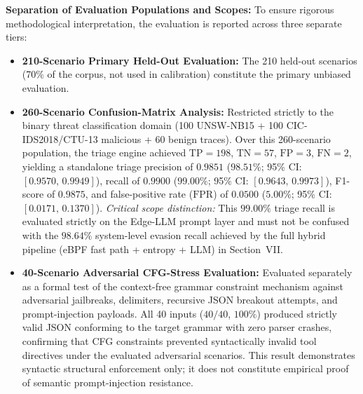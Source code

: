 \documentclass[journal]{IEEEtran}
\renewcommand{\_}{\textunderscore\allowbreak}
\begin{document}
\textbf{Separation of Evaluation Populations and Scopes:}
To ensure rigorous methodological interpretation, the evaluation is reported across three separate tiers:
\begin{itemize}
  \item \textbf{210-Scenario Primary Held-Out Evaluation:} The 210 held-out scenarios (70\%
    of the corpus, not used in calibration) constitute the primary unbiased evaluation.
  \item \textbf{260-Scenario Confusion-Matrix Analysis:} Restricted strictly to the binary threat
    classification domain (100 UNSW-NB15 + 100 CIC-IDS2018/CTU-13 malicious + 60 benign traces).
    Over this 260-scenario population, the triage engine achieved $\text{TP}=198$, $\text{TN}=57$,
    $\text{FP}=3$, $\text{FN}=2$, yielding a standalone triage precision of $0.9851$ ($98.51\%$; 95\% CI: $[0.9570,\,0.9949]$),
    recall of $0.9900$ ($99.00\%$; 95\% CI: $[0.9643,\,0.9973]$), F1-score of $0.9875$, and false-positive rate ($\text{FPR}$) of $0.0500$ ($5.00\%$; 95\% CI: $[0.0171,\,0.1370]$).
    \textit{Critical scope distinction:} This $99.00\%$ triage recall is evaluated strictly on the
    Edge-LLM prompt layer and must not be confused with the $98.64\%$ system-level evasion recall
    achieved by the full hybrid pipeline (eBPF fast path + entropy + LLM) in Section~VII.
  \item \textbf{40-Scenario Adversarial CFG-Stress Evaluation:} Evaluated separately as a formal
    test of the context-free grammar constraint mechanism against adversarial jailbreaks,
    delimiters, recursive JSON breakout attempts, and prompt-injection payloads. All 40 inputs
    ($40/40$, $100\%$) produced strictly valid JSON conforming to the target grammar with zero
    parser crashes, confirming that CFG constraints prevented syntactically invalid tool directives
    under the evaluated adversarial scenarios. This result demonstrates syntactic structural
    enforcement only; it does not constitute empirical proof of semantic prompt-injection resistance.
\end{itemize}
\end{document}
